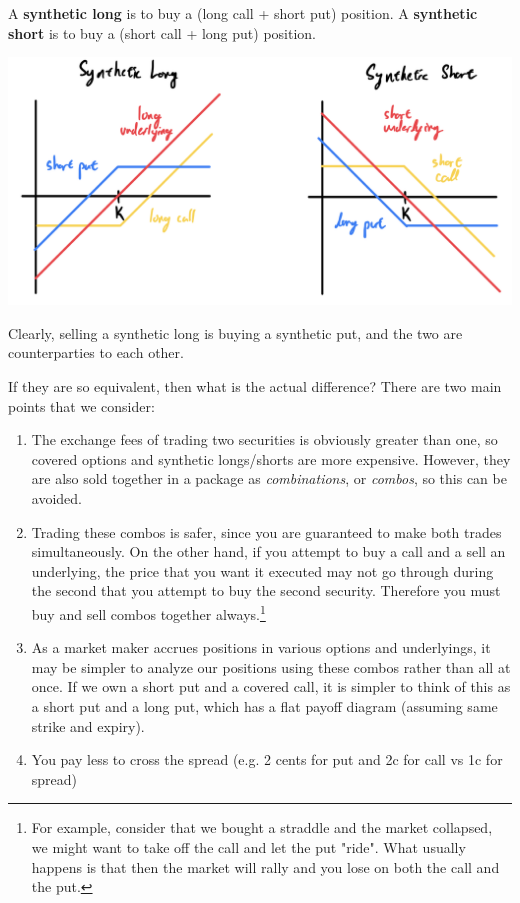 \documentclass{article}
\begin{document}
    \begin{definition}
      A \textbf{synthetic long} is to buy a (long call + short put) position. A \textbf{synthetic short} is to buy a (short call + long put) position. 
      \begin{center} 
        \includegraphics[scale=0.3]{img/synthetic_long_short.png}
      \end{center}
      Clearly, selling a synthetic long is buying a synthetic put, and the two are counterparties to each other. 
    \end{definition}

    If they are so equivalent, then what is the actual difference? There are two main points that we consider: 
    \begin{enumerate}
      \item The exchange fees of trading two securities is obviously greater than one, so covered options and synthetic longs/shorts are more expensive. However, they are also sold together in a package as \textit{combinations}, or \textit{combos}, so this can be avoided. 

      \item Trading these combos is safer, since you are guaranteed to make both trades simultaneously. On the other hand, if you attempt to buy a call and a sell an underlying, the price that you want it executed may not go through during the second that you attempt to buy the second security. Therefore you must buy and sell combos together always.\footnote{For example, consider that we bought a straddle and the market collapsed, we might want to take off the call and let the put "ride". What usually happens is that then the market will rally and you lose on both the call and the put. }

      \item As a market maker accrues positions in various options and underlyings, it may be simpler to analyze our positions using these combos rather than all at once. If we own a short put and a covered call, it is simpler to think of this as a short put and a long put, which has a flat payoff diagram (assuming same strike and expiry). 

      \item You pay less to cross the spread (e.g. 2 cents for put and 2c for call vs 1c for spread) 
    \end{enumerate}
\end{document}
